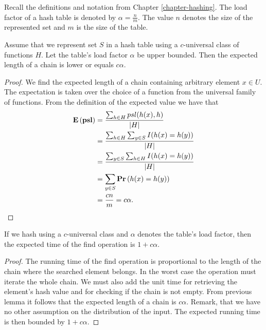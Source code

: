 Recall the definitions and notation from Chapter \ref{chapter-hashing}. The load factor of a hash table is denoted by $\alpha = \frac{n}{m}$. The value $n$ denotes the size of the represented set and $m$ is the size of the table.

\begin{theorem}
\label{theorem-expected-chain-length-universal}
Assume that we represent set $S$ in a hash table using a $c$-universal class of functions $H$. Let the table's load factor $\alpha$ be upper bounded. Then the expected length of a chain is lower or equals $c \alpha$.
\end{theorem}
\begin{proof}
We find the expected length of a chain containing arbitrary element $x \in U$. The expectation is taken over the choice of a function from the universal family of functions. From the definition of the expected value we have that
\begin{displaymath}
\begin{split}
\mathbf{E}\left(\mathbf{psl}\right) 
	& = \frac{\sum\displaylimits_{h \in H} psl(h(x), h) }{|H|} \\
	& = \frac{\sum\displaylimits_{h \in H} \sum\displaylimits_{y \in S} I(h(x) = h(y))}{|H|} \\
	& = \frac{\sum\displaylimits_{y \in S} \sum\displaylimits_{h \in H} I(h(x) = h(y))}{|H|}  \\
	& = \sum\displaylimits_{y \in S} \mathbf{Pr}\left(h(x) = h(y)\right) \\
	& = \frac{cn}{m} = c \alpha \text{.}
\end{split}
\end{displaymath}
\end{proof}

\begin{corollary}
If we hash using a $c$-universal class and $\alpha$ denotes the table's load factor, then the expected time of the find operation is $1 + c\alpha$.
\end{corollary}
\begin{proof}
The running time of the find operation is proportional to the length of the chain where the searched element belongs. In the worst case the operation must iterate the whole chain. We must also add the unit time for retrieving the element's hash value and for checking if the chain is not empty. From previous lemma it follows that the expected length of a chain is $c\alpha$. Remark, that we have no other assumption on the distribution of the input. The expected running time is then bounded by $1 + c\alpha$. 
\end{proof}

